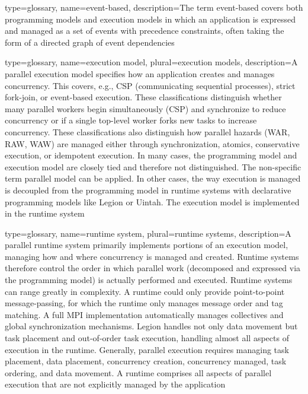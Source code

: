 {
  type=glossary,
  name={event-based},
  description={The term event-based covers both \glspl{programming model} and
    \glspl{execution model} in which an application is expressed and managed as a set of events with precedence constraints, often taking the form of a directed graph of event dependencies}
}

{
  type=glossary,
  name={execution model},
  plural={execution models},
  description={A parallel execution model specifies how an application creates
    and manages concurrency. This covers, e.g., \gls{CSP} (communicating
        sequential processes), strict \gls{fork-join}, or event-based
      execution.  These classifications distinguish whether many parallel
      workers begin simultaneously (\gls{CSP}) and synchronize to reduce concurrency
      or if a single top-level worker forks new tasks to increase concurrency.
      These classifications also distinguish how parallel hazards (\gls{WAR},
          \gls{RAW}, \gls{WAW}) are managed either through synchronization,
    atomics, conservative execution, or idempotent execution.  In many cases,
    the \gls{programming model} and execution model are closely tied and
      therefore not distinguished. The non-specific term parallel model can be
      applied. In other cases, the way execution is managed is decoupled from
      the \gls{programming model} in \glspl{runtime system} with
      \gls{declarative} \glspl{programming model} like Legion or Uintah. The execution model is implemented in the
      \gls{runtime system}}}

{
  type=glossary,
  name={runtime system},
  plural={runtime systems},
  description={A parallel runtime system primarily implements portions of an
  \gls{execution model}, managing how and where concurrency is managed and created. 
 Runtime systems therefore control the order in which parallel work (decomposed and expressed via the programming model) is actually performed and executed.  Runtime systems can range greatly in complexity. A runtime could only provide point-to-point message-passing, for which the runtime only manages message order and tag matching. A full \gls{MPI} implementation automatically manages collectives and global synchronization mechanisms.
  Legion handles not only data movement but task placement and out-of-order task execution, handling almost all aspects of execution in the runtime.  Generally, parallel execution requires managing task placement, data placement, concurrency creation, concurrency managed, task ordering, and data movement. A runtime comprises all aspects of parallel execution that are not explicitly managed by the application}
}

